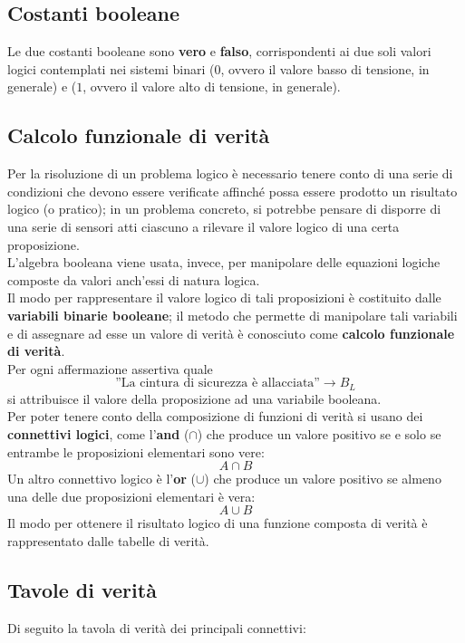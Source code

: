 \documentclass[a4paper]{extarticle}
\newcommand{\quotes}[1]{''#1''}
\begin{document}
\subsection{Costanti booleane}
Le due costanti booleane sono \textbf{vero} e \textbf{falso}, corrispondenti ai due soli valori logici contemplati nei sistemi binari (\(0\), ovvero il valore basso di tensione, in generale) e (\(1\), ovvero il valore alto di tensione, in generale).

\subsection{Calcolo funzionale di verità}
Per la risoluzione di un problema logico è necessario tenere conto di una serie di condizioni che devono essere verificate affinché possa essere prodotto un risultato logico (o pratico); in un problema concreto, si potrebbe pensare di disporre di una serie di sensori atti ciascuno a rilevare il valore logico di una certa proposizione.\\
L'algebra booleana viene usata, invece, per manipolare delle equazioni logiche composte da valori anch'essi di natura logica.\\
Il modo per rappresentare il valore logico di tali proposizioni è costituito dalle \textbf{variabili binarie booleane}; il metodo che permette di manipolare tali variabili e di assegnare ad esse un valore di verità è conosciuto come \textbf{calcolo funzionale di verità}.\\
Per ogni affermazione assertiva quale
\[\text{\quotes{La cintura di sicurezza è allacciata}} \rightarrow B_{L}\]
si attribuisce il valore della proposizione ad una variabile booleana.\\
Per poter tenere conto della composizione di funzioni di verità si usano dei \textbf{connettivi logici}, come l'\textbf{and} (\(\cap\)) che produce un valore positivo se e solo se entrambe le proposizioni elementari sono vere:
\[A \cap B\]
Un altro connettivo logico è l'\textbf{or} (\(\cup\)) che produce un valore positivo se almeno una delle due proposizioni elementari è vera:
\[A \cup B\]
Il modo per ottenere il risultato logico di una funzione composta di verità è rappresentato dalle tabelle di verità.

\subsection{Tavole di verità}
Di seguito la tavola di verità dei principali connettivi:
\end{document}
